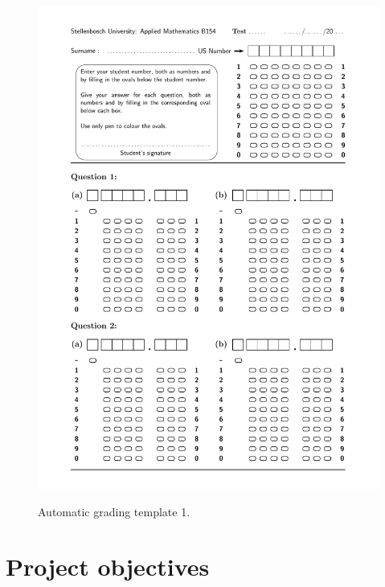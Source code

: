 \begin{figure}
  \centering
  \includegraphics[width=14cm]{NumbersTemplate}\\
  \caption{Automatic grading template 1.}
  \label{fig:NumbersTemplate}
\end{figure}

\section{Project objectives}
\label{sec:Objectives}

